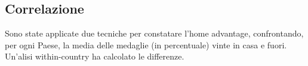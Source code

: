 \subsection{Correlazione}\label{sec:methods_correlation}








Sono state applicate due tecniche per constatare l'home advantage, confrontando,
per ogni Paese, la media delle medaglie (in percentuale) vinte in casa e
fuori.\\
Un'alisi within-country ha calcolato le differenze.\\






